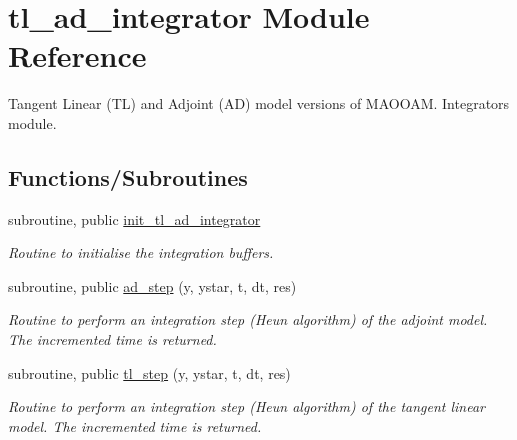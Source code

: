 \hypertarget{namespacetl__ad__integrator}{}\section{tl\+\_\+ad\+\_\+integrator Module Reference}
\label{namespacetl__ad__integrator}


Tangent Linear (TL) and Adjoint (AD) model versions of M\+A\+O\+O\+AM. Integrators module.  


\subsection*{Functions/\+Subroutines}
\begin{DoxyCompactItemize}
\item 
subroutine, public \hyperlink{namespacetl__ad__integrator_aeef5ff45fe5f9b73ceb8d72c195dc381}{init\+\_\+tl\+\_\+ad\+\_\+integrator}
\begin{DoxyCompactList}\small\item\em Routine to initialise the integration buffers. \end{DoxyCompactList}\item 
subroutine, public \hyperlink{namespacetl__ad__integrator_a708ece5eac01486e65e889d19073fd19}{ad\+\_\+step} (y, ystar, t, dt, res)
\begin{DoxyCompactList}\small\item\em Routine to perform an integration step (Heun algorithm) of the adjoint model. The incremented time is returned. \end{DoxyCompactList}\item 
subroutine, public \hyperlink{namespacetl__ad__integrator_ac88b155557d4fc0bae70007fde3aef06}{tl\+\_\+step} (y, ystar, t, dt, res)
\begin{DoxyCompactList}\small\item\em Routine to perform an integration step (Heun algorithm) of the tangent linear model. The incremented time is returned. \end{DoxyCompactList}\end{DoxyCompactItemize}

